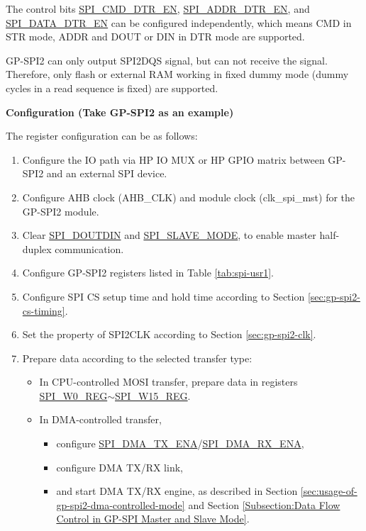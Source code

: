 \documentclass[main\_\_EN.tex]{subfiles}
\begin{document}
The control bits \hyperref[fielddesc:SPICMDDTREN]{SPI\_CMD\_DTR\_EN}, \hyperref[fielddesc:SPIADDRDTREN]{SPI\_ADDR\_DTR\_EN}, and \hyperref[fielddesc:SPIDATADTREN]{SPI\_DATA\_DTR\_EN} can be configured independently, which means CMD in STR mode, ADDR and DOUT or DIN in DTR mode are supported.

GP-SPI2 can only output SPI2DQS signal, but can not receive the signal. Therefore, only flash or external RAM working in fixed dummy mode (dummy cycles in a read sequence is fixed) are supported.

\textbf{Configuration (Take GP-SPI2 as an example)}

The register configuration can be as follows:
\begin{enumerate}
    \item Configure the IO path via HP IO MUX or HP GPIO matrix between GP-SPI2 and an external SPI device.
    \item Configure AHB clock (AHB\_CLK) and module clock (clk\_spi\_mst) for the GP-SPI2 module.

    \item Clear \hyperref[fielddesc:SPIDOUTDIN]{SPI\_DOUTDIN} and \hyperref[fielddesc:SPISLAVEMODE]{SPI\_SLAVE\_MODE}, to enable master half-duplex communication.

    \item Configure GP-SPI2 registers listed in Table \ref{tab:spi-usr1}.

    \item Configure SPI CS setup time and hold time according to Section \ref{sec:gp-spi2-cs-timing}.

    \item Set the property of SPI2CLK according to Section \ref{sec:gp-spi2-clk}.

    \item Prepare data according to the selected transfer type:
    \begin{itemize}
        \item In CPU-controlled MOSI transfer, prepare data in registers \hyperref[regdesc:SPIW0REG]{SPI\_W0\_REG}$\sim$\hyperref[regdesc:SPIW15REG]{SPI\_W15\_REG}.

        \item In DMA-controlled transfer,
        \begin{itemize}
            \item configure \hyperref[fielddesc:SPIDMATXENA]{SPI\_DMA\_TX\_ENA}/\hyperref[fielddesc:SPIDMARXENA]{SPI\_DMA\_RX\_ENA},
            \item configure DMA TX/RX link,
            \item and start DMA TX/RX engine, as described in Section \ref{sec:usage-of-gp-spi2-dma-controlled-mode} and Section \ref{Subsection:Data Flow Control in GP-SPI Master and Slave Mode}.
        \end{itemize}
    \end{itemize}


\end{enumerate}
\end{document}
